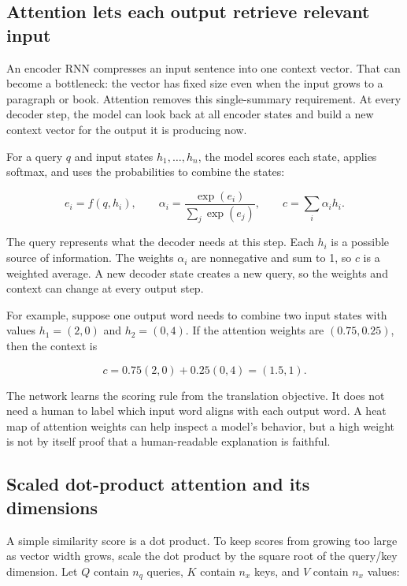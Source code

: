 \subsection{Attention lets each output retrieve relevant input}\label{04-visual-computing-ii-ch031-attention-lets-each-output-retrieve-relevant-input}

An encoder RNN compresses an input sentence into one context vector. That can become a bottleneck: the vector has fixed size even when the input grows to a paragraph or book. Attention removes this single-summary requirement. At every decoder step, the model can look back at all encoder states and build a new context vector for the output it is producing now.

For a query \(q\) and input states \(h_1,\ldots,h_n\), the model scores each state, applies softmax, and uses the probabilities to combine the states:

\[
e_i=f(q,h_i),\qquad
\alpha_i=\frac{\exp(e_i)}{\sum_j\exp(e_j)},\qquad
c=\sum_i\alpha_i h_i.
\]

The query represents what the decoder needs at this step. Each \(h_i\) is a possible source of information. The weights \(\alpha_i\) are nonnegative and sum to 1, so \(c\) is a weighted average. A new decoder state creates a new query, so the weights and context can change at every output step.

For example, suppose one output word needs to combine two input states with values \(h_1=(2,0)\) and \(h_2=(0,4)\). If the attention weights are \((0.75,0.25)\), then the context is

\[
c=0.75(2,0)+0.25(0,4)=(1.5,1).
\]

The network learns the scoring rule from the translation objective. It does not need a human to label which input word aligns with each output word. A heat map of attention weights can help inspect a model's behavior, but a high weight is not by itself proof that a human-readable explanation is faithful.

\subsection{Scaled dot-product attention and its dimensions}\label{04-visual-computing-ii-ch031-scaled-dot-product-attention-and-its-dimensions}

A simple similarity score is a dot product. To keep scores from growing too large as vector width grows, scale the dot product by the square root of the query/key dimension. Let \(Q\) contain \(n_q\) queries, \(K\) contain \(n_x\) keys, and \(V\) contain \(n_x\) values:

